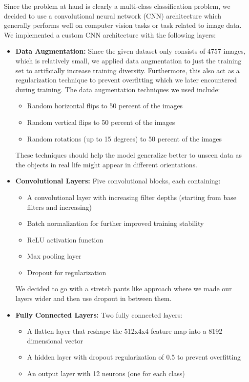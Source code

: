 \documentclass[10pt]{article}
\begin{document}
Since the problem at hand is clearly a multi-class classification problem, we decided to use a convolutional neural network (CNN) architecture which generally performs well on computer vision tasks
or task related to image data. We implemented a custom CNN architecture with the following layers:

\begin{itemize}
    \item \textbf{Data Augmentation:} Since the given dataset only consists of 4757 images, which is relatively small, we applied data augmentation to just the
    training set to artificially increase training diversity. Furthermore, this also act as a regularization technique to prevent overfitting which we later
    encountered during training. The data augmentation techniques we used include:
    \begin{itemize}
        \item Random horizontal flips to 50 percent of the images
        \item Random vertical flips to 50 percent of the images
        \item Random rotations (up to 15 degrees) to 50 percent of the images
    \end{itemize}
    These techniques should help the model generalize better to unseen data as the objects in real life might appear in different orientations.

    \item \textbf{Convolutional Layers:} Five convolutional blocks, each containing:
    \begin{itemize}
        \item A convolutional layer with increasing filter depths (starting from base filters and increasing)
        \item Batch normalization for further improved training stability
        \item ReLU activation function
        \item Max pooling layer
        \item Dropout for regularization
    \end{itemize}
    We decided to go with a stretch pants like approach where we made our layers wider and then use dropout in between them.

    \item \textbf{Fully Connected Layers:} Two fully connected layers:
    \begin{itemize}
        \item A flatten layer that reshape the 512x4x4 feature map into a 8192-dimensional vector
        \item A hidden layer with dropout regularization of 0.5 to prevent overfitting
        \item An output layer with 12 neurons (one for each class)
    \end{itemize}


\end{itemize}
\end{document}
